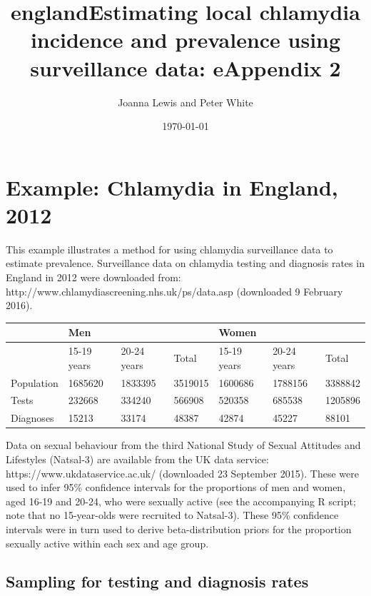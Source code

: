 \documentclass{article}
\title{england}
\begin{document}
    
    
    \author{Joanna Lewis and Peter White}\title{Estimating local chlamydia incidence and prevalence using surveillance data: eAppendix 2}

\date{\today}
\maketitle

\tableofcontents


    
    

    
    \section{Example: Chlamydia in England,
2012}\label{example-chlamydia-in-england-2012}

This example illustrates a method for using chlamydia surveillance data
to estimate prevalence. Surveillance data on chlamydia testing and
diagnosis rates in England in 2012 were downloaded from:
http://www.chlamydiascreening.nhs.uk/ps/data.asp (downloaded 9 February
2016).

\begin{longtable}[c]{@{}lllllll@{}}
\toprule
& Men & & & Women & &\tabularnewline
\midrule
\endhead
& 15-19 years & 20-24 years & Total & 15-19 years & 20-24 years &
Total\tabularnewline
Population & 1685620 & 1833395 & 3519015 & 1600686 & 1788156 &
3388842\tabularnewline
Tests & 232668 & 334240 & 566908 & 520358 & 685538 &
1205896\tabularnewline
Diagnoses & 15213 & 33174 & 48387 & 42874 & 45227 & 88101\tabularnewline
\bottomrule
\end{longtable}

Data on sexual behaviour from the third National Study of Sexual
Attitudes and Lifestyles (Natsal-3) are available from the UK data
service: https://www.ukdataservice.ac.uk/ (downloaded 23 September
2015). These were used to infer 95\% confidence intervals for the
proportions of men and women, aged 16-19 and 20-24, who were sexually
active (see the accompanying R script; note that no 15-year-olds were
recruited to Natsal-3). These 95\% confidence intervals were in turn
used to derive beta-distribution priors for the proportion sexually
active within each sex and age group.

\subsection{Sampling for testing and diagnosis
rates}\label{sampling-for-testing-and-diagnosis-rates}
\end{document}
